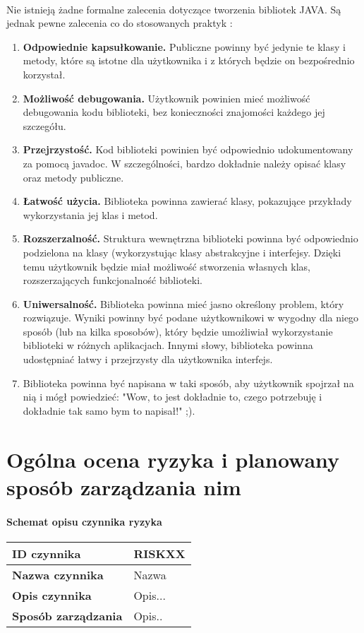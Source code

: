 \documentclass[a4paper,10pt]{article}
\begin{document}
\paragraph{} Nie istnieją żadne formalne zalecenia dotyczące tworzenia bibliotek JAVA. Są jednak pewne zalecenia co do stosowanych praktyk \cite{artOstandardach}:
\begin{enumerate}
\item \textbf{Odpowiednie kapsułkowanie.} Publiczne powinny być jedynie te klasy i metody, które są istotne dla użytkownika i z których będzie on bezpośrednio korzystał.
\item \textbf{Możliwość debugowania.} Użytkownik powinien mieć możliwość debugowania kodu biblioteki, bez konieczności znajomości każdego jej szczegółu.
\item  \textbf{Przejrzystość.} Kod biblioteki powinien być odpowiednio udokumentowany za pomocą javadoc. W szczególności, bardzo dokładnie należy opisać klasy oraz metody publiczne.
\item \textbf{Łatwość użycia.} Biblioteka powinna zawierać klasy, pokazujące przykłady wykorzystania jej klas i metod.
\item \textbf{ Rozszerzalność.} Struktura wewnętrzna biblioteki powinna być odpowiednio podzielona na klasy (wykorzystując klasy abstrakcyjne i interfejsy. Dzięki temu użytkownik będzie miał możliwość stworzenia własnych klas, rozszerzających funkcjonalność biblioteki.
\item \textbf{Uniwersalność.} Biblioteka powinna mieć jasno określony problem, który rozwiązuje. Wyniki powinny być podane użytkownikowi w wygodny dla niego sposób (lub na kilka sposobów), który będzie umożliwiał wykorzystanie biblioteki w różnych aplikacjach. Innymi słowy, biblioteka powinna udostępniać łatwy i przejrzysty dla użytkownika interfejs.
\item Biblioteka powinna być napisana w taki sposób, aby użytkownik spojrzał na nią i mógł powiedzieć: "Wow, to jest dokładnie to, czego potrzebuję i dokładnie tak samo bym to napisał!" ;).

\end{enumerate} 



\section{Ogólna ocena ryzyka i planowany sposób zarządzania nim}


\paragraph{Schemat opisu czynnika ryzyka}
\begin{center}
\begin{tabular}{|l|p{12cm}|}
\hline
\textbf{ID czynnika} &  RISKXX \tabularnewline \hline
\textbf{Nazwa czynnika} & Nazwa \tabularnewline \hline
\textbf{Opis czynnika} & Opis... \tabularnewline \hline
\textbf{Sposób zarządzania} & Opis.. \tabularnewline \hline
\end{tabular}
\end{center}
\end{document}
